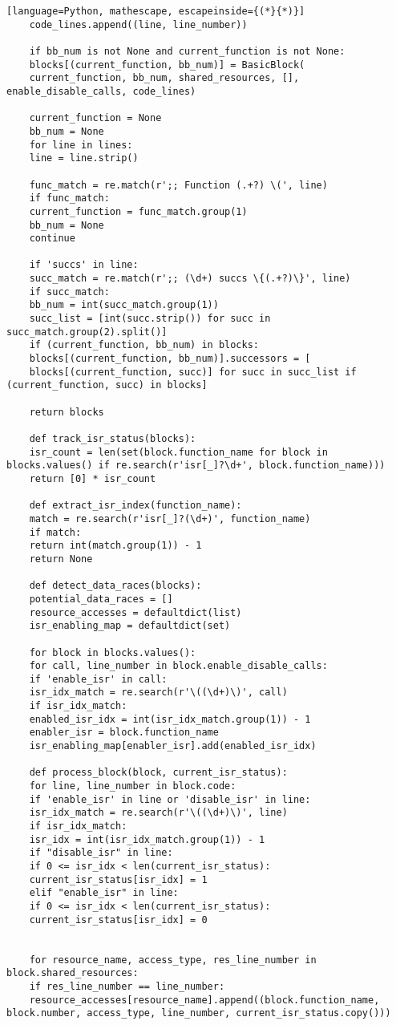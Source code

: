 \documentclass[
fancyheadings, %
%
%
]{stsreprt}
\begin{document}
\begin{lstlisting}[language=Python, mathescape, escapeinside={(*}{*)}]
	code_lines.append((line, line_number))
	
	if bb_num is not None and current_function is not None:
	blocks[(current_function, bb_num)] = BasicBlock(
	current_function, bb_num, shared_resources, [], enable_disable_calls, code_lines)
	
	current_function = None
	bb_num = None
	for line in lines:
	line = line.strip()
	
	func_match = re.match(r';; Function (.+?) \(', line)
	if func_match:
	current_function = func_match.group(1)
	bb_num = None
	continue
	
	if 'succs' in line:
	succ_match = re.match(r';; (\d+) succs \{(.+?)\}', line)
	if succ_match:
	bb_num = int(succ_match.group(1))
	succ_list = [int(succ.strip()) for succ in succ_match.group(2).split()]
	if (current_function, bb_num) in blocks:
	blocks[(current_function, bb_num)].successors = [
	blocks[(current_function, succ)] for succ in succ_list if (current_function, succ) in blocks]
	
	return blocks
	
	def track_isr_status(blocks):
	isr_count = len(set(block.function_name for block in blocks.values() if re.search(r'isr[_]?\d+', block.function_name)))
	return [0] * isr_count  
	
	def extract_isr_index(function_name):
	match = re.search(r'isr[_]?(\d+)', function_name)
	if match:
	return int(match.group(1)) - 1
	return None
	
	def detect_data_races(blocks):
	potential_data_races = []
	resource_accesses = defaultdict(list)
	isr_enabling_map = defaultdict(set)
	
	for block in blocks.values():
	for call, line_number in block.enable_disable_calls:
	if 'enable_isr' in call:
	isr_idx_match = re.search(r'\((\d+)\)', call)
	if isr_idx_match:
	enabled_isr_idx = int(isr_idx_match.group(1)) - 1
	enabler_isr = block.function_name
	isr_enabling_map[enabler_isr].add(enabled_isr_idx)
	
	def process_block(block, current_isr_status):
	for line, line_number in block.code:
	if 'enable_isr' in line or 'disable_isr' in line:
	isr_idx_match = re.search(r'\((\d+)\)', line)
	if isr_idx_match:
	isr_idx = int(isr_idx_match.group(1)) - 1  
	if "disable_isr" in line:
	if 0 <= isr_idx < len(current_isr_status):
	current_isr_status[isr_idx] = 1
	elif "enable_isr" in line:
	if 0 <= isr_idx < len(current_isr_status):
	current_isr_status[isr_idx] = 0
	
	
	for resource_name, access_type, res_line_number in block.shared_resources:
	if res_line_number == line_number:
	resource_accesses[resource_name].append((block.function_name, block.number, access_type, line_number, current_isr_status.copy()))
	

\end{lstlisting}
\end{document}
